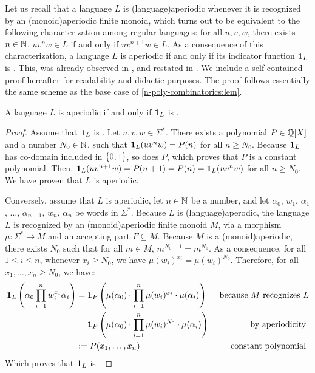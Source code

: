 Let us recall that a language $L$ is \intro(language){aperiodic} whenever it is
recognized by an \kl(monoid){aperiodic} finite monoid, which turns out to be
equivalent to the following characterization among regular languages: for all
$u,v,w$, there exists $n \in \mathbb{N}$, $u v^n w \in L$ if and only if $u v^{n+1} w
\in L$. As a consequence of this characterization, a language $L$ is aperiodic
if and only if its indicator function $\mathbf{1}_{L}$ is .
This, was already observed in \cite[Claim V.6]{CDTL23}, and restated in
\cite[Claim 7.45, Lemma 7.53]{DOUE23}. We include a self-contained proof
hereafter for readability and didactic purposes. The proof follows essentially
the same scheme as the base case of \cref{n-poly-combinatorics:lem}.

\begin{example}
    \label{aperidic-ultimately-polynomial:ex}
    A language $L$ is aperiodic if and only if 
    $\mathbf{1}_{L}$ is .
\end{example}
\begin{proof}
    Assume that $\mathbf{1}_{L}$ is . Let $u,v,w \in
    \Sigma^*$. There exists a polynomial $P \in \mathbb{Q}[X]$ and a number $N_0 \in
    \mathbb{N}$, such that $\mathbf{1}_{L}(u v^n w) = P(n)$ for all $n \geq N_0$. Because
    $\mathbf{1}_{L}$ has co-domain included in $\mathopen{\{} 0,1 \mathclose{\}}$, so does $P$, which proves
    that $P$ is a constant polynomial. Then, $\mathbf{1}_{L}(u v^{n+1} w) = P(n+1) =
    P(n) = \mathbf{1}_{L}(uv^n w)$ for all $n \geq N_0$. We have proven that $L$
    is aperiodic.

    Conversely, assume that $L$ is aperiodic, let $n \in \mathbb{N}$ be a number, and
    let $\alpha_0$, $w_1$, $\alpha_1$, $\ldots$, $\alpha_{n-1}$, $w_n$, $\alpha_n$
    be words in $\Sigma^*$. Because $L$ is \kl(language){aperodic}, the language
    $L$ is recognized by an \kl(monoid){aperiodic} finite monoid $M$, via a
    morphism $\mu \colon \Sigma^* \to M$ and an accepting part $F \subseteq M$.
    Because $M$ is a \kl(monoid){aperiodic}, there exists $N_0$
    such that for all $m \in M$, $m^{N_0+1} = m^{N_0}$. As a consequence,
    for all $1 \leq i \leq n$,
    whenever $x_i \geq N_0$, we have $\mu(w_i)^{x_i} = \mu(w_i)^{N_0}$.
    Therefore, for all $x_1, \dots, x_n \geq N_0$, we have:
    \begin{align*}
        \mathbf{1}_{L}\left(\alpha_0 \prod_{i= 1}^n w_i^{x_i} \alpha_i \right) 
        &= 
        \mathbf{1}_{P}\left(\mu(\alpha_0) \cdot \prod_{i= 1}^n \mu(w_i)^{x_i} \cdot \mu(\alpha_i)\right)
        & \text{ because $M$ recognizes $L$}
        \\
        &= 
        \mathbf{1}_{P}\left(\mu(\alpha_0) \cdot \prod_{i= 1}^n \mu(w_i)^{N_0} \cdot \mu(\alpha_i)\right)
        & \text{ by aperiodicity }
        \\
        &\mathrel{:=} P(x_1, \dots, x_n) & \text{ constant polynomial }
    \end{align*}
    Which proves that $\mathbf{1}_{L}$ is .
\end{proof}

